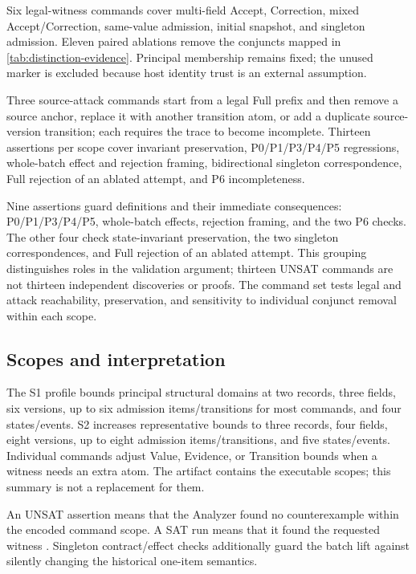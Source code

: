 Six legal-witness commands cover multi-field Accept, Correction, mixed Accept/Correction, same-value admission, initial snapshot, and singleton admission. Eleven paired ablations remove the conjuncts mapped in \cref{tab:distinction-evidence}. Principal membership remains fixed; the unused  marker is excluded because host identity trust is an external assumption.

Three source-attack commands start from a legal Full prefix and then remove a source anchor, replace it with another transition atom, or add a duplicate source-version transition; each requires the trace to become incomplete. Thirteen assertions per scope cover invariant preservation, P0/P1/P3/P4/P5 regressions, whole-batch effect and rejection framing, bidirectional singleton correspondence, Full rejection of an ablated attempt, and P6 incompleteness.

Nine assertions guard definitions and their immediate consequences: P0/P1/P3/P4/P5, whole-batch effects, rejection framing, and the two P6 checks. The other four check state-invariant preservation, the two singleton correspondences, and Full rejection of an ablated attempt. This grouping distinguishes roles in the validation argument; thirteen UNSAT commands are not thirteen independent discoveries or proofs. The command set tests legal and attack reachability, preservation, and sensitivity to individual conjunct removal within each scope.

\subsection{Scopes and interpretation}

The S1 profile bounds principal structural domains at two records, three fields, six versions, up to six admission items/transitions for most commands, and four states/events. S2 increases representative bounds to three records, four fields, eight versions, up to eight admission items/transitions, and five states/events. Individual commands adjust Value, Evidence, or Transition bounds when a witness needs an extra atom. The artifact contains the executable scopes; this summary is not a replacement for them.



An UNSAT assertion means that the Analyzer found no counterexample within the encoded command scope. A SAT run means that it found the requested witness \citep{jackson2002alloy,torlak2007kodkod}. Singleton contract/effect checks additionally guard the batch lift against silently changing the historical one-item semantics.

